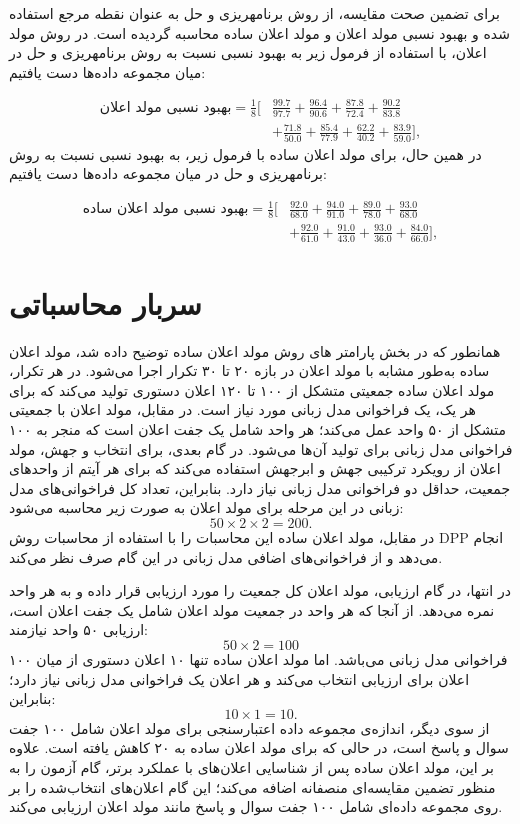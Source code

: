 برای تضمین صحت مقایسه، از روش برنامه\/ریزی و حل به عنوان نقطه مرجع استفاده شده و بهبود نسبی مولد اعلان و مولد اعلان ساده محاسبه گردیده است. در روش مولد اعلان، با استفاده از فرمول زیر به بهبود نسبی
  نسبت به روش برنامه\/ریزی و حل در میان مجموعه داده‌ها دست یافتیم:

\[
\begin{split}
	\text{بهبود نسبی مولد اعلان} = \frac{1}{8} \Bigg[
	& \frac{99.7}{97.7} + \frac{96.4}{90.6} + \frac{87.8}{72.4}  + \frac{90.2}{83.8} \\
	& + \frac{71.8}{50.0} + \frac{85.4}{77.9} + \frac{62.2}{40.2} + \frac{83.9}{59.0}
	\Bigg],
\end{split}
\]
در همین حال، برای مولد اعلان ساده با فرمول زیر، به بهبود نسبی
 نسبت به روش برنامه\/ریزی و حل در میان مجموعه داده‌ها دست یافتیم:

     
\[
 \begin{split}
   	\text{بهبود نسبی مولد اعلان ساده} = \frac{1}{8} \Bigg[
   	& \frac{92.0}{68.0} + \frac{94.0}{91.0} + \frac{89.0}{78.0} + \frac{93.0}{68.0}\\
   	& + \frac{92.0}{61.0} + \frac{91.0}{43.0}  + \frac{93.0}{36.0} + \frac{84.0}{66.0}
   	\Bigg],
 \end{split}
\]
     
     
\section{سربار محاسباتی}
همانطور که در بخش پارامتر های روش مولد اعلان ساده توضیح داده شد، مولد اعلان ساده به‌طور مشابه با مولد اعلان در بازه ۲۰ تا ۳۰ تکرار اجرا می‌شود. در هر تکرار، مولد اعلان ساده جمعیتی متشکل از ۱۰۰ تا ۱۲۰ اعلان دستوری تولید می‌کند که برای هر یک، یک فراخوانی مدل زبانی مورد نیاز است. در مقابل، مولد اعلان با جمعیتی متشکل از ۵۰ واحد عمل می‌کند؛ هر واحد شامل یک جفت اعلان است که منجر به ۱۰۰ فراخوانی مدل زبانی برای تولید آن‌ها می‌شود. در گام بعدی، برای انتخاب و جهش، مولد اعلان از رویکرد ترکیبی جهش و ابرجهش استفاده می‌کند که برای هر آیتم از واحدهای جمعیت، حداقل دو فراخوانی مدل زبانی نیاز دارد. بنابراین، تعداد کل فراخوانی‌های مدل زبانی در این مرحله برای مولد اعلان به صورت زیر محاسبه می‌شود:
\[
50 \times 2 \times 2 = 200.
\]
در مقابل، مولد اعلان ساده این محاسبات را با استفاده از محاسبات روش DPP انجام می‌دهد و از فراخوانی‌های اضافی مدل زبانی در این گام صرف نظر می‌کند.

در انتها، در گام ارزیابی، مولد اعلان کل جمعیت را مورد ارزیابی قرار داده و به هر واحد نمره می‌دهد. از آنجا که هر واحد در جمعیت مولد اعلان شامل یک جفت اعلان است، ارزیابی ۵۰ واحد نیازمند:
\[
50 \times 2 = 100
\]
فراخوانی مدل زبانی می‌باشد. اما مولد اعلان ساده تنها ۱۰ اعلان دستوری از میان ۱۰۰ اعلان برای ارزیابی انتخاب می‌کند و هر اعلان یک فراخوانی مدل زبانی نیاز دارد؛ بنابراین:
\[
10 \times 1 = 10.
\]
از سوی دیگر، اندازه‌ی مجموعه داده اعتبارسنجی برای مولد اعلان شامل ۱۰۰ جفت سوال و پاسخ است، در حالی که برای مولد اعلان ساده به ۲۰ کاهش یافته است. علاوه بر این، مولد اعلان ساده پس از شناسایی اعلان‌های با عملکرد برتر، گام آزمون را به منظور تضمین مقایسه‌ای منصفانه اضافه می‌کند؛ این گام اعلان‌های انتخاب‌شده را بر روی مجموعه داده‌ای شامل ۱۰۰ جفت سوال و پاسخ مانند مولد اعلان ارزیابی می‌کند.

